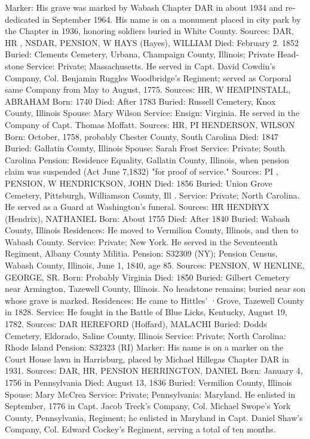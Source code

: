 Marker: His grave was marked by Wabash Chapter DAR in about 1934 and re­dedicated in September 1964. His name is on a monument placed in city park by the Chapter in 1936, honoring soldiers buried in White County. 
Sources: DAR, HR , NSDAR, PENSION, W 
HAYS (Hayes), WILLIAM 
Died: February 2. 1852 
Buried: Clements Cemetery, Urbana, Champaign County, Illinois; Private Head­stone 
Service: Private; Massachusetts. He served in Capt. David Cowdin's Company, Col. Benjamin Ruggles Woodbridge's Regiment; served as Corporal same Company from May to August, 1775. 
Sources: HR, W 
HEMPINSTALL, ABRAHAM 
Born: 1740 
Died: After 1783 
Buried: Russell Cemetery, Knox County, Illinois 
Spouse: Mary Wilson Service: Ensign: Virginia. He served in the Company of Capt. Thomas Moffatt. 
Sources: HR, PI 
HENDERSON, WILSON 
Born: October, 1758, probably Chester County, South Carolina 
Died: 1847 Buried: Gallatin County, Illinois 
Spouse: Sarah Frost 
Service: Private; South Carolina Pension: Residence Equality, Gallatin County, Illinois, when pension claim was suspended (Act June 7,1832) "for proof of service."
 Sources: PI , PENSION, W 
HENDRICKSON, JOHN 
Died: 1856 
Buried: Union Grove Cemetery, Pittsburgh, Williamson County, Ill . 
Service: Private; North Carolina. He served as a Guard at Washington's funeral. 
Sources: HR 
HENDRYX (Hendrix), NATHANIEL 
Born: About 1755 
Died: After 1840 
Buried: Wabash County, Illinois 
Residences: He moved to Vermilion County, Illinois, and then to Wabash County. 
Service: Private; New York. He served in the Seventeenth Regiment, Albany County Militia. 
Pension: S32309 (NY); Pension Census, Wabash County, Illinois, June 1, 1840, age 85. 
Sources: PENSION, W 
HENLINE, GEORGE, SR. 
Born: Probably Virginia 
Died: 1850 
Buried: Gilbert Cemetery near Armington, Tazewell County, Illinois. No head­stone remains; buried near son whose grave is marked. 
Residences: He came to Hittles' ·Grove, Tazewell County in 1828. 
Service: He fought in the Battle of Blue Licks, Kentucky, August 19, 1782. 
Sources: DAR 
HEREFORD (Hoffard), MALACHI 
Buried: Dodds Cemetery, Eldorado, Saline County, Illinois 
Service: Private; North Carolina: Rhode Island 
Pension: S32323 (RI) 
Marker: His name is on a marker on the Court House lawn in Harrisburg, placed by Michael Hillegas Chapter DAR in 1931. 
Sources: DAR, HR, PENSION 
HERRINGTON, DANIEL 
Born: January 4, 1756 in Pennsylvania 
Died: August 13, 1836 
Buried: Vermilion County, Illinois 
Spouse: Mary McCrea 
Service: Private; Pennsylvania: Maryland. He enlisted in September, 1776 in Capt. Jacob Treck's Company, Col. Michael Swope's York County, Pennsyl­vania, Regiment; he enlisted in Maryland in Capt. Daniel Shaw's Company, Col. Edward Cockey's Regiment, serving a total of ten months. 
